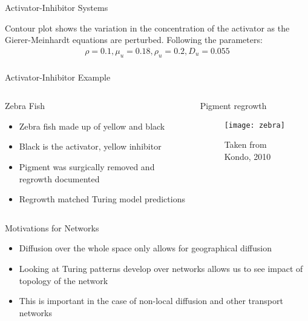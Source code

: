 \documentclass[pdf]{beamer}
\begin{document}
\begin{frame}{Activator-Inhibitor Systems}
   \begin{center}
   \end{center}
   Contour plot shows the variation in the concentration of the activator as the Gierer-Meinhardt equations are perturbed. Following the parameters:
   \begin{align*}
\rho = 0.1, \mu_u=0.18, \rho_u=0.2, D_u=0.055  \\   
   \end{align*}
\end{frame}

\begin{frame}{Activator-Inhibitor Example}
\begin{columns}[T]
    \begin{column}{.5\textwidth}
     \begin{block}{Zebra Fish}
\begin{itemize}
\item Zebra fish made up of yellow and black
\item Black is the activator, yellow inhibitor
\item Pigment was surgically removed and regrowth documented
\item Regrowth matched Turing model predictions
\end{itemize}
    \end{block}
    \end{column}
    \begin{column}{.5\textwidth}
    \begin{block}{Pigment regrowth}
    \begin{figure}[l]
    \texttt{[image: zebra]}
    \caption{Taken from Kondo, 2010}
    \end{figure}
    \end{block}
    \end{column}
  \end{columns}
\end{frame}

\begin{frame}{Motivations for Networks}
\begin{itemize}
\item Diffusion over the whole space only allows for geographical diffusion
\item Looking at Turing patterns develop over networks allows us to see impact of topology of the network
\item This is important in the case of non-local diffusion and other transport networks
\end{itemize}
\end{frame}
\end{document}
